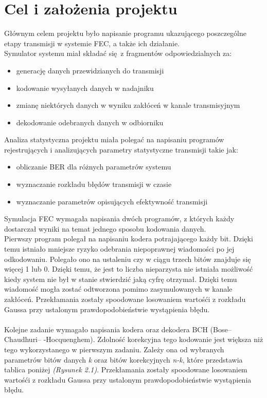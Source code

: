 \documentclass[12pt,a4paper,notitlepage]{report}
\begin{document}
    \chapter{Cel i założenia projektu}
    Głównym celem projektu było napisanie programu ukazującego poszczególne etapy transmisji w systemie FEC, a także ich działanie.\\
    Symulator systemu miał składać się z fragmentów odpowiedzialnych za:
    \begin{itemize}
        \item generację danych przewidzianych do transmisji
        \item kodowanie wysyłanych danych w nadajniku
        \item zmianę niektórych danych w wyniku zakłóceń w kanale transmisyjnym
        \item dekodowanie odebranych danych w odbiorniku\\
    \end{itemize}
    Analiza statystyczna projektu miała polegać na napisaniu programów rejestrujących i analizujących parametry statystyczne transmisji takie jak:
    \begin{itemize}
        \item obliczanie BER dla różnych parametrów systemu
        \item wyznaczanie rozkładu błędów transmisji w czasie
        \item wyznaczanie parametrów opisujących efektywność transmisji\\
    \end{itemize}
    Symulacja FEC wymagała napisania dwóch programów, z których każdy dostarczał wyniki na temat jednego sposobu kodowania  danych.\\
    Pierwszy program polegał na napisaniu kodera potrajającego każdy bit. Dzięki temu istniało mniejsze ryzyko odebrania niepoprawnej wiadomości po jej odkodowaniu. Polegało ono na ustaleniu czy w ciągu trzech bitów znajduje się więcej 1 lub 0. Dzięki temu, że jest to liczba nieparzysta nie istniała możliwość kiedy system nie był w stanie stwierdzić jaką cyfrę otrzymał. Dzięki temu wiadomość mogła zostać odtworzona pomimo zasymulowanych w kanale zakłóceń. Przekłamania zostały spoodowane losowaniem wartośći z rozkładu Gaussa przy ustalonym prawdopodobieństwie wystąpienia błędu.\\\\
    Kolejne zadanie wymagało napisania kodera oraz dekodera BCH (Bose–Chaudhuri– -Hocquenghem). Zdolność korekcyjna tego kodowanie jest większa niż tego wykorzystanego w pierwszym zadaniu. Zależy ona od wybranych parametrów bitów danych \textit{k} oraz bitów korekcyjnych \textit{n-k}, które przedstawia tablica poniżej \textit{(Rysunek 2.1)}.  Przekłamania zostały spoodowane losowaniem wartośći z rozkładu Gaussa przy ustalonym prawdopodobieństwie wystąpienia błędu.
\end{document}
